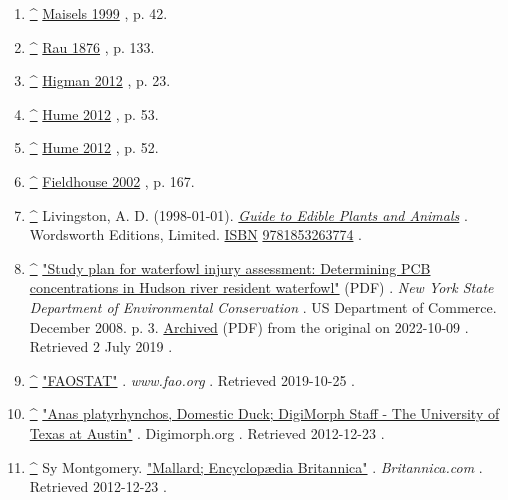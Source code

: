 \documentclass[11pt,a4paper]{article}
\begin{document}
\begin{enumerate}
\item \href{\#cite\_ref-FOOTNOTEMaisels199942\_37-0}{\textbf{\textasciicircum{}}} \href{\#CITEREFMaisels1999}{Maisels 1999} , p. 42.
\item \href{\#cite\_ref-FOOTNOTERau1876133\_38-0}{\textbf{\textasciicircum{}}} \href{\#CITEREFRau1876}{Rau 1876} , p. 133.
\item \href{\#cite\_ref-FOOTNOTEHigman201223\_39-0}{\textbf{\textasciicircum{}}} \href{\#CITEREFHigman2012}{Higman 2012} , p. 23.
\item \href{\#cite\_ref-FOOTNOTEHume201253\_40-0}{\textbf{\textasciicircum{}}} \href{\#CITEREFHume2012}{Hume 2012} , p. 53.
\item \href{\#cite\_ref-FOOTNOTEHume201252\_41-0}{\textbf{\textasciicircum{}}} \href{\#CITEREFHume2012}{Hume 2012} , p. 52.
\item \href{\#cite\_ref-FOOTNOTEFieldhouse2002167\_42-0}{\textbf{\textasciicircum{}}} \href{\#CITEREFFieldhouse2002}{Fieldhouse 2002} , p. 167.
\item \href{\#cite\_ref-43}{\textbf{\textasciicircum{}}} Livingston, A. D. (1998-01-01). \href{https://books.google.com/books?id=NViSMffyaSgC\&q=\%C2\%A0\%C2\%A0In+many+areas,+wild+ducks+of+various+species+are+hunted+for+food+or+sport}{\textit{Guide to Edible Plants and Animals}} . Wordsworth Editions, Limited. \href{/wiki/ISBN\_(identifier)}{ISBN} \href{/wiki/Special:BookSources/9781853263774}{9781853263774} .
\item \href{\#cite\_ref-44}{\textbf{\textasciicircum{}}} \href{https://www.dec.ny.gov/docs/fish\_marine\_pdf/wfp09a.pdf}{"Study plan for waterfowl injury assessment: Determining PCB concentrations in Hudson river resident waterfowl"} (PDF) . \textit{New York State Department of Environmental Conservation} . US Department of Commerce. December 2008. p. 3. \href{https://ghostarchive.org/archive/20221009/https://www.dec.ny.gov/docs/fish\_marine\_pdf/wfp09a.pdf}{Archived} (PDF) from the original on 2022-10-09 . Retrieved 2 July 2019 .
\item \href{\#cite\_ref-45}{\textbf{\textasciicircum{}}} \href{http://www.fao.org/faostat/en/\#data/QL}{"FAOSTAT"} . \textit{www.fao.org} . Retrieved 2019-10-25 .
\item \href{\#cite\_ref-46}{\textbf{\textasciicircum{}}} \href{http://digimorph.org/specimens/anas\_platyrhynchos/skull/}{"Anas platyrhynchos, Domestic Duck; DigiMorph Staff - The University of Texas at Austin"} . Digimorph.org . Retrieved 2012-12-23 .
\item \href{\#cite\_ref-47}{\textbf{\textasciicircum{}}} Sy Montgomery. \href{https://www.britannica.com/eb/topic-360302/mallard}{"Mallard; Encyclopædia Britannica"} . \textit{Britannica.com} . Retrieved 2012-12-23 .

\end{enumerate}
\end{document}
